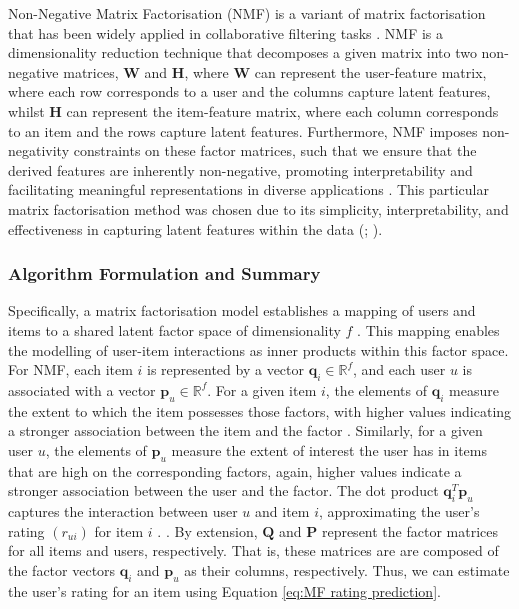 Non-Negative Matrix Factorisation (NMF) is a variant of matrix factorisation that has been widely applied in collaborative filtering tasks \cite{lee2000algorithms}. NMF is a dimensionality reduction technique that decomposes a given matrix into two non-negative matrices, $\mathbf{W}$ and $\mathbf{H}$, where $\mathbf{W}$ can represent the user-feature matrix, where each row corresponds to a user and the columns capture latent features, whilst $\mathbf{H}$ can represent the item-feature matrix, where each column corresponds to an item and the rows capture latent features. Furthermore, NMF imposes non-negativity constraints on these factor matrices, such that we ensure that the derived features are inherently non-negative, promoting interpretability and facilitating meaningful representations in diverse applications \cite{koren2009matrix}. This particular matrix factorisation method was chosen due to its simplicity, interpretability, and effectiveness in capturing latent features within the data (\cite{koren2009matrix}; \cite{lee2000algorithms}).


\subsubsection{Algorithm Formulation and Summary}
\label{subsubsec:4 Algorithm Formulation MF}

Specifically, a matrix factorisation model establishes a mapping of users and items to a shared latent factor space of dimensionality $f$ \cite{koren2009matrix}. This mapping enables the modelling of user-item interactions as inner products within this factor space. For NMF, each item $i$ is represented by a vector $\mathbf{q}_i \in \mathbb{R}^f$, and each user $u$ is associated with a vector $\mathbf{p}_u \in \mathbb{R}^f$. For a given item $i$, the elements of $\mathbf{q}_i$ measure the extent to which the item possesses those factors, with higher values indicating a stronger association between the item and the factor \cite{koren2009matrix}. Similarly, for a given user $u$, the elements of $\mathbf{p}_u$ measure the extent of interest the user has in items that are high on the corresponding factors, again, higher values indicate a stronger association between the user and the factor. The dot product $\mathbf{q}_i^T \mathbf{p}_u$ captures the interaction between user $u$ and item $i$, approximating the user's rating $\left(r_{u i}\right)$ for item $i$ \cite{koren2009matrix}. . By extension, $\mathbf{Q}$ and $\mathbf{P}$ represent the factor matrices for all items and users, respectively. That is, these matrices are are composed of the factor vectors $\mathbf{q}_i$ and $\mathbf{p}_u$ as their columns, respectively. Thus, we can estimate the user's rating for an item using Equation \ref{eq:MF rating prediction}.

